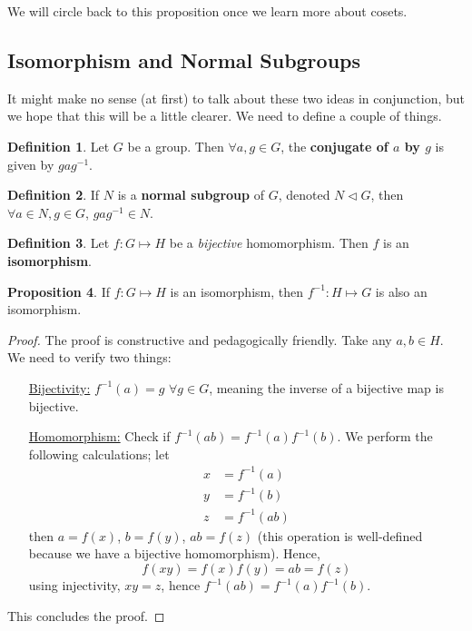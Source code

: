 \documentclass[11pt]{amsart} %
\theoremstyle{definition}
\newtheorem{definition}{Definition}[section]
\newtheorem{proposition}[definition]{Proposition}
\theoremstyle{definition}
\numberwithin{equation}{section}
\begin{document}
We will circle back to this proposition once we learn more about cosets.

\subsection{Isomorphism and Normal Subgroups}

It might make no sense (at first) to talk about these two ideas in conjunction, but we hope that this will be a little clearer. We need to define a couple of things.

\begin{definition}
	Let $G$ be a group. Then $\forall a,g \in G$, the \textbf{conjugate of $a$ by $g$} is given by $gag^{-1}$.
\end{definition}

\begin{definition}
	If $N$ is a \textbf{normal subgroup} of $G$, denoted $N \lhd G$, then $\forall a \in N, g\in G$, $gag^{-1} \in N$.
\end{definition}

\begin{definition}
	Let $f: G \mapsto H$ be a \textit{bijective} homomorphism. Then $f$ is an \textbf{isomorphism}.
\end{definition}

\begin{proposition}
	If $f: G \mapsto H$ is an isomorphism, then $f^{-1}: H\mapsto G$ is also an isomorphism.
\end{proposition}

\begin{proof}
	The proof is constructive and pedagogically friendly. Take any $a,b \in H$. We need to verify two things:
	\begin{enumerate}[  align=left]
		\item[\uline{Bijectivity:}] $f^{-1} (a) = g$ $\forall g \in G$, meaning the inverse of a bijective map is bijective.
		\item[\uline{Homomorphism:}] Check if $f^{-1} (ab) = f^{-1} (a) f^{-1} (b)$. We perform the following calculations; let
		$$\begin{aligned}
		x&= f^{-1} (a) \\
		y&= f^{-1} (b)	\\	
		z&= f^{-1} (ab)
		\end{aligned}$$
		then $a=f(x)$, $b=f(y)$, $ab=f(z)$ (this operation is well-defined because we have a bijective homomorphism). Hence,
		$$f(xy) = f(x) f(y) = ab = f(z)$$
		using injectivity, $xy=z$, hence $f^{-1} (ab) = f^{-1} (a) f^{-1} (b)$.
	\end{enumerate}
This concludes the proof.
\end{proof}
\end{document}
